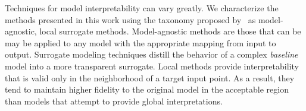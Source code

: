 \documentclass[letterpaper]{article} %
\begin{document}
Techniques for model interpretability can vary greatly.
We characterize the methods presented in this work using the taxonomy proposed by~\citet{adadi2018} as model-agnostic, local surrogate methods.
Model-agnostic methods are those that can be may be applied to any model with the appropriate mapping from input to output.
Surrogate modeling techniques distill the behavior of a complex \emph{baseline} model into a more transparent surrogate.
Local methods provide interpretability that is valid only in the neighborhood of a target input point.
As a result, they tend to maintain higher fidelity to the original model in the acceptable region than models that attempt to provide global interpretations.



\end{document}
